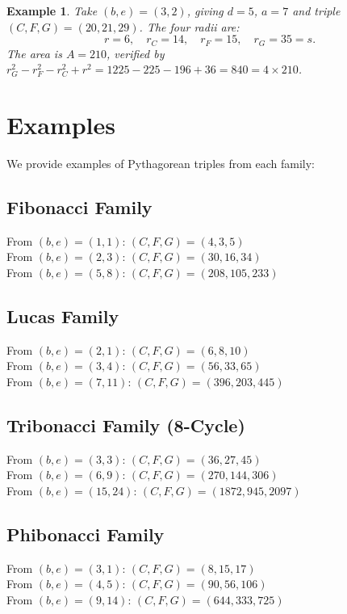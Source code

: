 \documentclass[12pt]{article}
\newtheorem{example}{Example}
\begin{document}
\begin{example}
Take $(b,e) = (3,2)$, giving $d=5$, $a=7$ and triple $(C,F,G) = (20,21,29)$.
The four radii are:
\[
  r = 6,\quad r_C = 14,\quad r_F = 15,\quad r_G = 35 = s.
\]
The area is $A = 210$, verified by $r_G^2 - r_F^2 - r_C^2 + r^2 = 1225-225-196+36 = 840 = 4\times 210$.
\end{example}

\section{Examples}

We provide examples of Pythagorean triples from each family:

\subsection{Fibonacci Family}
From $(b, e) = (1, 1)$: $(C, F, G) = (4, 3, 5)$\\
From $(b, e) = (2, 3)$: $(C, F, G) = (30, 16, 34)$\\
From $(b, e) = (5, 8)$: $(C, F, G) = (208, 105, 233)$

\subsection{Lucas Family}
From $(b, e) = (2, 1)$: $(C, F, G) = (6, 8, 10)$\\
From $(b, e) = (3, 4)$: $(C, F, G) = (56, 33, 65)$\\
From $(b, e) = (7, 11)$: $(C, F, G) = (396, 203, 445)$

\subsection{Tribonacci Family (8-Cycle)}
From $(b, e) = (3, 3)$: $(C, F, G) = (36, 27, 45)$\\
From $(b, e) = (6, 9)$: $(C, F, G) = (270, 144, 306)$\\
From $(b, e) = (15, 24)$: $(C, F, G) = (1872, 945, 2097)$

\subsection{Phibonacci Family}
From $(b, e) = (3, 1)$: $(C, F, G) = (8, 15, 17)$\\
From $(b, e) = (4, 5)$: $(C, F, G) = (90, 56, 106)$\\
From $(b, e) = (9, 14)$: $(C, F, G) = (644, 333, 725)$
\end{document}
